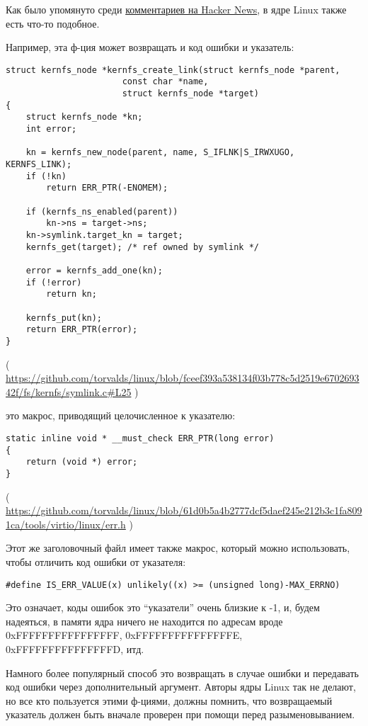 Как было упомянуто среди \href{https://news.ycombinator.com/item?id=11823647}{комментариев на Hacker News},
в ядре Linux также есть что-то подобное.

Например, эта ф-ция может возвращать и код ошибки и указатель:

\begin{lstlisting}[style=customc]
struct kernfs_node *kernfs_create_link(struct kernfs_node *parent,
				       const char *name,
				       struct kernfs_node *target)
{
	struct kernfs_node *kn;
	int error;

	kn = kernfs_new_node(parent, name, S_IFLNK|S_IRWXUGO, KERNFS_LINK);
	if (!kn)
		return ERR_PTR(-ENOMEM);

	if (kernfs_ns_enabled(parent))
		kn->ns = target->ns;
	kn->symlink.target_kn = target;
	kernfs_get(target);	/* ref owned by symlink */

	error = kernfs_add_one(kn);
	if (!error)
		return kn;

	kernfs_put(kn);
	return ERR_PTR(error);
}
\end{lstlisting}

( \url{https://github.com/torvalds/linux/blob/fceef393a538134f03b778c5d2519e670269342f/fs/kernfs/symlink.c#L25} )

 это макрос, приводящий целочисленное к указателю:

\begin{lstlisting}[style=customc]
static inline void * __must_check ERR_PTR(long error)
{
	return (void *) error;
}
\end{lstlisting}

( \url{https://github.com/torvalds/linux/blob/61d0b5a4b2777dcf5daef245e212b3c1fa8091ca/tools/virtio/linux/err.h} )

Этот же заголовочный файл имеет также макрос, который можно использовать, чтобы отличить код ошибки от указателя:

\begin{lstlisting}[style=customc]
#define IS_ERR_VALUE(x) unlikely((x) >= (unsigned long)-MAX_ERRNO)
\end{lstlisting}

Это означает, коды ошибок это ``указатели'' очень близкие к -1, и, будем надеяться, в памяти ядра ничего не находится
по адресам вроде 0xFFFFFFFFFFFFFFFF, 0xFFFFFFFFFFFFFFFE, 0xFFFFFFFFFFFFFFFD, итд.

Намного более популярный способ это возвращать  в случае ошибки и передавать код ошибки через дополнительный
аргумент.
Авторы ядры Linux так не делают, но все кто пользуется этими ф-циями, должны помнить, что возвращаемый указатель
должен быть вначале проверен при помощи  перед разыменовыванием.


